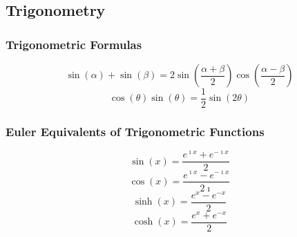 \subsection{Trigonometry} \label{app:Trig}
	\subsubsection{Trigonometric Formulas} \label{subsubsec:Trig Formulas}
		\begin{equation} \label{eq:Sin plus Sin with diff Angles}
			\sin \left( \alpha \right) + \sin \left( \beta \right) = 2 \sin \left( \frac{\alpha + \beta}{2} \right) \cos\left( \frac{\alpha - \beta}{2} \right)  
		\end{equation}
		\begin{equation} \label{eq:Cosine-Sine Product}
			\cos \left( \theta \right) \sin \left( \theta \right) = \frac{1}{2} \sin \left( 2 \theta \right)
		\end{equation}
	
	\subsubsection{Euler Equivalents of Trigonometric Functions} \label{subsubsec:Euler Equivalents}
		\begin{equation} \label{eq:Euler Sin}
			\sin \left( x \right) = \frac{e^{\imath x} + e^{-\imath x}}{2}
		\end{equation}
		\begin{equation} \label{eq:Euler Cos}
			\cos \left( x \right) = \frac{e^{\imath x} - e^{-\imath x}}{2 \imath}
		\end{equation}
		\begin{equation} \label{eq:Euler Sinh}
			\sinh \left( x \right) = \frac{e^{x} - e^{-x}}{2}
		\end{equation}
		\begin{equation} \label{eq:Euler Cosh}
			\cosh \left( x \right) = \frac{e^{x} + e^{-x}}{2}
		\end{equation}